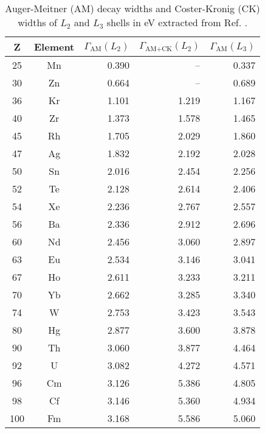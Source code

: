 \begin{table*}[htb]
 \caption{Auger-Meitner (AM) decay widths and Coster-Kronig (CK) widths
          of $L_2$ and $L_3$ shells in \unit{eV} extracted from
          Ref. \cite{Chen81}.}
 \begin{tabular}{ccrrr}
 \toprule
 Z & Element & $\Gamma_\text{AM}(L_2)$ & $\Gamma_\text{AM+CK}(L_2)$ & $\Gamma_\text{AM}(L_3)$\\
 \midrule
 25 & Mn & 0.390 &  --   & 0.337 \\
 30 & Zn & 0.664 &  --   & 0.689 \\
 36 & Kr & 1.101 & 1.219 & 1.167 \\
 40 & Zr & 1.373 & 1.578 & 1.465 \\
 45 & Rh & 1.705 & 2.029 & 1.860 \\
 47 & Ag & 1.832 & 2.192 & 2.028 \\
 50 & Sn & 2.016 & 2.454 & 2.256 \\
 52 & Te & 2.128 & 2.614 & 2.406 \\
 54 & Xe & 2.236 & 2.767 & 2.557 \\
 56 & Ba & 2.336 & 2.912 & 2.696 \\
 60 & Nd & 2.456 & 3.060 & 2.897 \\
 63 & Eu & 2.534 & 3.146 & 3.041 \\
 67 & Ho & 2.611 & 3.233 & 3.211 \\
 70 & Yb & 2.662 & 3.285 & 3.340 \\
 74 & W  & 2.753 & 3.423 & 3.543 \\
 80 & Hg & 2.877 & 3.600 & 3.878 \\
 90 & Th & 3.060 & 3.877 & 4.464 \\
 92 & U  & 3.082 & 4.272 & 4.571 \\
 96 & Cm & 3.126 & 5.386 & 4.805 \\
 98 & Cf & 3.146 & 5.360 & 4.934 \\
100 & Fm & 3.168 & 5.586 & 5.060 \\
 \bottomrule
 \end{tabular}
 \label{tab:L}
\end{table*}
